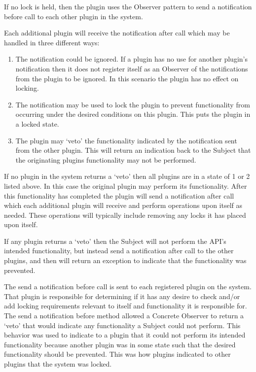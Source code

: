 \documentclass[12pt,english,a4paper,]{article}
\begin{document}
\bigskip

If no lock is held, then the plugin uses the Observer pattern to send a notification before call to each other plugin in the system.  

\bigskip

Each additional plugin will receive the notification after call which may be handled in three different ways:

\begin{enumerate}
\item The notification could be ignored.  If a plugin has no use for another plugin’s notification then it does not register itself as an Observer of the notifications from the plugin to be ignored.  In this scenario the plugin has no effect on locking.

\item The notification may be used to lock the plugin to prevent functionality from occurring under the desired conditions on this plugin.  This puts the plugin in a locked state.  

\item The plugin may ‘veto’ the functionality indicated by the notification sent from the other plugin.  This will return an indication back to the Subject that the originating plugins functionality may not be performed.   
\end{enumerate}

If no plugin in the system returns a ‘veto’ then all plugins are in a state of 1 or 2 listed above.  In this case the original plugin may perform its functionality.  After this functionality has completed the plugin will send a notification after call which each additional plugin will receive and perform operations upon itself as needed.  These operations will typically include removing any locks it has placed upon itself.  

\bigskip

If any plugin returns a ‘veto’ then the Subject will not perform the API’s intended functionality, but instead send a notification after call to the other plugins, and then will return an exception to indicate that the functionality was prevented.  

\bigskip

The send a notification before call is sent to each registered plugin on the system.  That plugin is responsible for determining if it has any desire to check and/or add locking requirements relevant to itself and functionality it is responsible for.  The send a notification before method allowed a Concrete Observer to return a ‘veto’ that would indicate any functionality a Subject could not perform.  This behavior was used to indicate to a plugin that it could not perform its intended functionality because another plugin was in some state such that the desired functionality should be prevented.  This was how plugins indicated to other plugins that the system was locked.  
\end{document}
